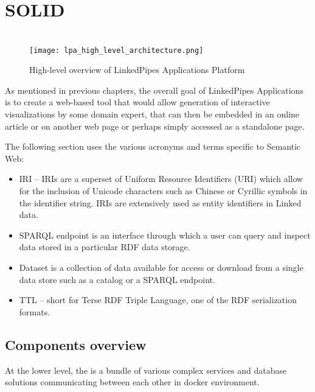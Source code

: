 \section{SOLID}

\section{\lpa{}}


\begin{figure}[h]

\centering
\texttt{[image: lpa\_high\_level\_architecture.png]}
\caption{High-level overview of LinkedPipes Applications Platform}
\label{fig:high-level-arch}
\end{figure}

As mentioned in previous chapters, the overall goal of LinkedPipes Applications is to create a web-based tool that would allow generation of interactive visualizations by some domain expert, that can then be embedded in an online article or on another web page or perhaps simply accessed as a standalone page.

The following section uses the various acronyms and terms specific to Semantic Web: 

\begin{itemize}
    \item \gls{IRI} -- IRIs are a superset of Uniform Resource Identifiers (URI) which allow for the inclusion of Unicode characters such as Chinese or Cyrillic symbols in the identifier string. IRIs are extensively used as entity identifiers in Linked data.
    \item SPARQL endpoint is an interface through which a user can query and inspect data stored in a particular RDF data storage.
    \item Dataset is a collection of data available for access or download from a single data store such as a catalog or a SPARQL endpoint.
    \item TTL -- short for Terse RDF Triple Language, one of the RDF serialization formats.
\end{itemize}

\subsection{Components overview}

At the lower level, the \lpa{} is a bundle of various complex services and database solutions communicating between each other in docker environment. 

